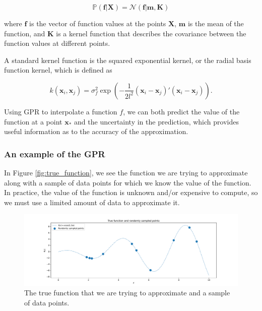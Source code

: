 \documentclass[\econtexRoot/SequentialEGM]{subfiles}
\begin{document}
\begin{equation}
	\mathbb{P}(\mathbf{f} | \mathbf{X}) = \mathcal{N}(\mathbf{f} | \mathbf{m}, \mathbf{K})
\end{equation}

where $\mathbf{f}$ is the vector of function values at the points $\mathbf{X}$, $\mathbf{m}$ is the mean of the function, and $\mathbf{K}$ is a kernel function that describes the covariance between the function values at different points.

A standard kernel function is the squared exponential kernel, or the radial basis function kernel, which is defined as

\begin{equation}
	k(\mathbf{x}_i, \mathbf{x}_j) = \sigma^2_f \exp\left(-\frac{1}{2l^2} (\mathbf{x}_i - \mathbf{x}_j)' (\mathbf{x}_i - \mathbf{x}_j)\right).
\end{equation}

Using GPR to interpolate a function $f$, we can both predict the value of the function at a point $\mathbf{x}_*$ and the uncertainty in the prediction, which provides useful information as to the accuracy of the approximation.

\subsubsection{An example of the GPR}

In Figure \ref{fig:true_function}, we see the function we are trying to approximate along with a sample of data points for which we know the value of the function. In practice, the value of the function is unknown and/or expensive to compute, so we must use a limited amount of data to approximate it.

\begin{figure}
	\centering
	\includegraphics[width=\linewidth]{Figures/true_function.pdf}
	\caption{The true function that we are trying to approximate and a sample of data points.}
	\notinsubfile{\label{fig:true_function}}
\end{figure}
\end{document}
